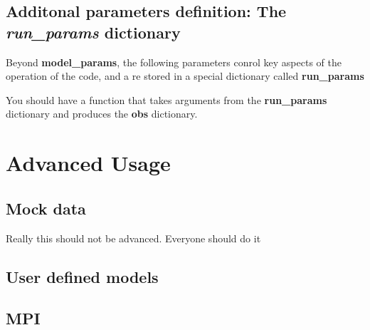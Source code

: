 \subsection{Additonal parameters definition: The \emph{run_params} dictionary}
Beyond {\bf model_params}, the following parameters conrol key aspects of the operation of the code, and a re stored in a special dictionary called {\bf run_params}

You should have a function that takes arguments from the {\bf run_params} dictionary and produces the {\bf obs}  dictionary.


\section{Advanced Usage}
\subsection{Mock data}
Really this should not be advanced.  Everyone should do it

\subsection{User defined models}

\subsection{MPI}




